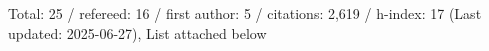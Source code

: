 Total: 25 / refereed: 16 / first author: 5 / citations: 2,619 / h-index: 17 (Last updated: 2025-06-27), List attached below